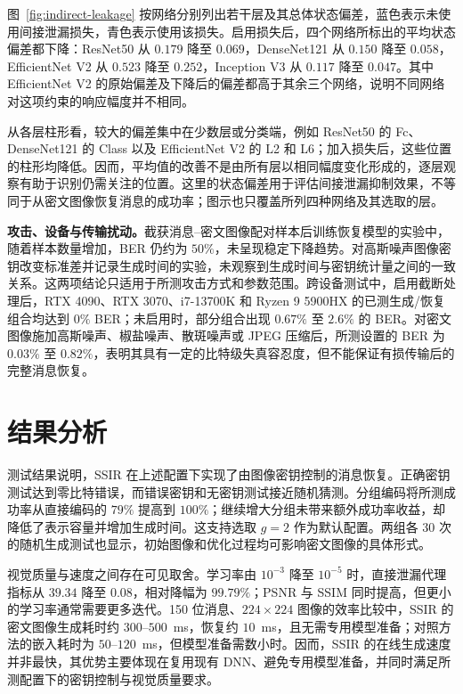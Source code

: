 图~\ref{fig:indirect-leakage} 按网络分别列出若干层及其总体状态偏差，蓝色表示未使用间接泄漏损失，青色表示使用该损失。启用损失后，四个网络所标出的平均状态偏差都下降：ResNet50 从 $0.179$ 降至 $0.069$，DenseNet121 从 $0.150$ 降至 $0.058$，EfficientNet V2 从 $0.523$ 降至 $0.252$，Inception V3 从 $0.117$ 降至 $0.047$。其中 EfficientNet V2 的原始偏差及下降后的偏差都高于其余三个网络，说明不同网络对这项约束的响应幅度并不相同。

从各层柱形看，较大的偏差集中在少数层或分类端，例如 ResNet50 的 Fc、DenseNet121 的 Class 以及 EfficientNet V2 的 L2 和 L6；加入损失后，这些位置的柱形均降低。因而，平均值的改善不是由所有层以相同幅度变化形成的，逐层观察有助于识别仍需关注的位置。这里的状态偏差用于评估间接泄漏抑制效果，不等同于从密文图像恢复消息的成功率；图示也只覆盖所列四种网络及其选取的层。

\textbf{攻击、设备与传输扰动。}截获消息--密文图像配对样本后训练恢复模型的实验中，随着样本数量增加，BER 仍约为 $50\%$，未呈现稳定下降趋势。对高斯噪声图像密钥改变标准差并记录生成时间的实验，未观察到生成时间与密钥统计量之间的一致关系。这两项结论只适用于所测攻击方式和参数范围。跨设备测试中，启用截断处理后，RTX 4090、RTX 3070、i7-13700K 和 Ryzen 9 5900HX 的已测生成/恢复组合均达到 $0\%$ BER；未启用时，部分组合出现 $0.67\%$ 至 $2.6\%$ 的 BER。对密文图像施加高斯噪声、椒盐噪声、散斑噪声或 JPEG 压缩后，所测设置的 BER 为 $0.03\%$ 至 $0.82\%$，表明其具有一定的比特级失真容忍度，但不能保证有损传输后的完整消息恢复。

\section{结果分析}

测试结果说明，SSIR 在上述配置下实现了由图像密钥控制的消息恢复。正确密钥测试达到零比特错误，而错误密钥和无密钥测试接近随机猜测。分组编码将所测成功率从直接编码的 $79\%$ 提高到 $100\%$；继续增大分组未带来额外成功率收益，却降低了表示容量并增加生成时间。这支持选取 $g=2$ 作为默认配置。两组各 30 次的随机生成测试也显示，初始图像和优化过程均可影响密文图像的具体形式。

视觉质量与速度之间存在可见取舍。学习率由 $10^{-3}$ 降至 $10^{-5}$ 时，直接泄漏代理指标从 $39.34$ 降至 $0.08$，相对降幅为 $99.79\%$；PSNR 与 SSIM 同时提高，但更小的学习率通常需要更多迭代。150 位消息、$224\times224$ 图像的效率比较中，SSIR 的密文图像生成耗时约 $300$--$500$~ms，恢复约 $10$~ms，且无需专用模型准备；对照方法的嵌入耗时为 $50$--$120$~ms，但模型准备需数小时。因而，SSIR 的在线生成速度并非最快，其优势主要体现在复用现有 DNN、避免专用模型准备，并同时满足所测配置下的密钥控制与视觉质量要求。

